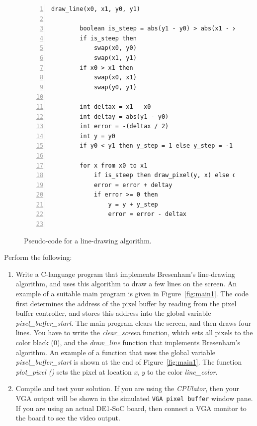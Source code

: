 \documentclass[epsfig,10pt,fullpage]{article}
\begin{document}
\begin{figure}[th]
	\centering
		\begin{lstlisting}[numbers=left, stepnumber=1, xleftmargin=1cm]
  draw_line(x0, x1, y0, y1)
		
		boolean is_steep = abs(y1 - y0) > abs(x1 - x0)
		if is_steep then
			swap(x0, y0)
			swap(x1, y1)
		if x0 > x1 then
			swap(x0, x1)
			swap(y0, y1)
			
		int deltax = x1 - x0
		int deltay = abs(y1 - y0)
		int error = -(deltax / 2)
		int y = y0
		if y0 < y1 then y_step = 1 else y_step = -1
		
		for x from x0 to x1
			if is_steep then draw_pixel(y, x) else draw_pixel(x, y)
			error = error + deltay
			if error >= 0 then
				y = y + y_step
				error = error - deltax
			
\end{lstlisting}
	\caption{Pseudo-code for a line-drawing algorithm.}
	\label{fig:line_algorithm}
\end{figure}

Perform the following:

\begin{enumerate}

\item Write a C-language program that implements Bresenham's line-drawing algorithm,
and uses this algorithm to draw a few lines on the screen.  An example of a suitable main 
program is given in Figure~\ref{fig:main1}. The code first determines the address of the 
pixel buffer by reading from the pixel buffer controller, and stores this address into the
global variable {\it pixel\_buffer\_start}. The main program clears the screen, and then 
draws four lines.  You have to write the {\it clear\_screen} function, which sets all
pixels to the color black (0), and the {\it draw\_line} function that implements
Bresenham's algorithm.  An example of a function that uses the global variable 
{\it pixel\_buffer\_start} is shown at the end of Figure~\ref{fig:main1}. The function 
{\it plot\_pixel ()} sets the pixel at location {\it x}, {\it y} to the color {\it line\_color}. 

\item Compile and test your solution. If you are using the {\it CPUlator}, then your VGA output
will be shown in the simulated \texttt{VGA pixel buffer} window pane. If you are using an
actual DE1-SoC board, then connect a VGA monitor to the board to see the video output.
\end{enumerate}
\end{document}
